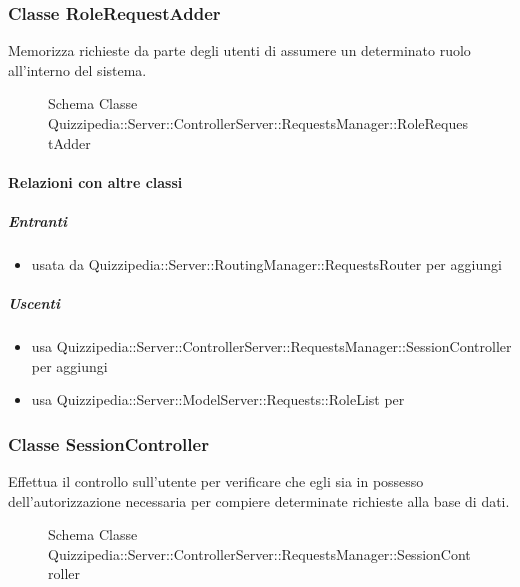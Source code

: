 \subsubsection{Classe RoleRequestAdder}
Memorizza richieste da parte degli utenti di assumere un determinato ruolo all'interno del sistema.
\begin{figure}[H]
\centering
\noindent{}
\caption[Schema Classe RoleRequestAdder]{Schema Classe Quizzipedia::Server::ControllerServer::RequestsManager::RoleRequestAdder}
\end{figure}
\paragraph{Relazioni con altre classi}
\subparagraph{Entranti}
\begin{itemize}
\item usata da Quizzipedia::Server::RoutingManager::RequestsRouter per aggiungi
\end{itemize}
\subparagraph{Uscenti}
\begin{itemize}
\item usa Quizzipedia::Server::ControllerServer::RequestsManager::SessionController per aggiungi
\item usa Quizzipedia::Server::ModelServer::Requests::RoleList per 
\end{itemize}
\subsubsection{Classe SessionController}
Effettua il controllo sull'utente per verificare che egli sia in possesso dell'autorizzazione necessaria per compiere determinate richieste alla base di dati.
\begin{figure}[H]
\centering
\noindent{}
\caption[Schema Classe SessionController]{Schema Classe Quizzipedia::Server::ControllerServer::RequestsManager::SessionController}
\end{figure}
